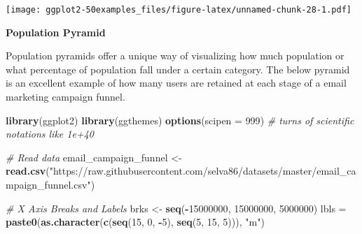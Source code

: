 \documentclass[a4paper]{article}
\newenvironment{Shaded}{\begin{snugshade}}{\end{snugshade}}
\newcommand{\KeywordTok}[1]{\textcolor[rgb]{0.13,0.29,0.53}{\textbf{#1}}}
\newcommand{\DataTypeTok}[1]{\textcolor[rgb]{0.13,0.29,0.53}{#1}}
\newcommand{\DecValTok}[1]{\textcolor[rgb]{0.00,0.00,0.81}{#1}}
\newcommand{\StringTok}[1]{\textcolor[rgb]{0.31,0.60,0.02}{#1}}
\newcommand{\CommentTok}[1]{\textcolor[rgb]{0.56,0.35,0.01}{\textit{#1}}}
\newcommand{\OperatorTok}[1]{\textcolor[rgb]{0.81,0.36,0.00}{\textbf{#1}}}
\newcommand{\NormalTok}[1]{#1}
\begin{document}
\texttt{[image: ggplot2-50examples\_files/figure-latex/unnamed-chunk-28-1.pdf]}

\newpage

\textbf{Population Pyramid}

Population pyramids offer a unique way of visualizing how much
population or what percentage of population fall under a certain
category. The below pyramid is an excellent example of how many users
are retained at each stage of a email marketing campaign funnel.

\begin{Shaded}
\begin{Highlighting}[]
\KeywordTok{library}\NormalTok{(ggplot2)}
\KeywordTok{library}\NormalTok{(ggthemes)}
\KeywordTok{options}\NormalTok{(}\DataTypeTok{scipen =} \DecValTok{999}\NormalTok{)  }\CommentTok{# turns of scientific notations like 1e+40}

\CommentTok{# Read data}
\NormalTok{email_campaign_funnel <-}
\StringTok{  }\KeywordTok{read.csv}\NormalTok{(}\StringTok{"https://raw.githubusercontent.com/selva86/datasets/master/email_campaign_funnel.csv"}\NormalTok{)}

\CommentTok{# X Axis Breaks and Labels }
\NormalTok{brks <-}\StringTok{ }\KeywordTok{seq}\NormalTok{(}\OperatorTok{-}\DecValTok{15000000}\NormalTok{, }\DecValTok{15000000}\NormalTok{, }\DecValTok{5000000}\NormalTok{)}
\NormalTok{lbls =}\StringTok{ }\KeywordTok{paste0}\NormalTok{(}\KeywordTok{as.character}\NormalTok{(}\KeywordTok{c}\NormalTok{(}\KeywordTok{seq}\NormalTok{(}\DecValTok{15}\NormalTok{, }\DecValTok{0}\NormalTok{, }\OperatorTok{-}\DecValTok{5}\NormalTok{), }\KeywordTok{seq}\NormalTok{(}\DecValTok{5}\NormalTok{, }\DecValTok{15}\NormalTok{, }\DecValTok{5}\NormalTok{))), }\StringTok{"m"}\NormalTok{)}


\end{Highlighting}
\end{Shaded}
\end{document}
